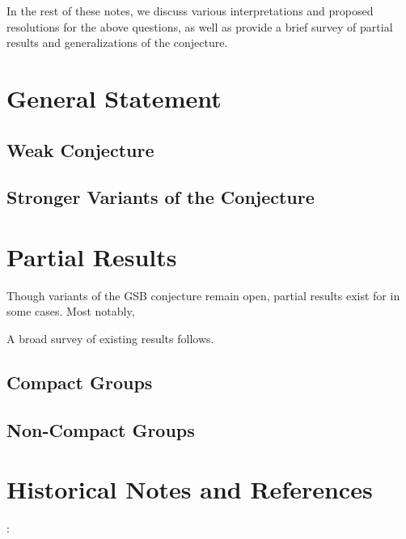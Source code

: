 In the rest of these notes, we discuss various interpretations and proposed resolutions for the above questions, as well as provide a brief survey of partial results and generalizations of the conjecture.










\section{General Statement}
\subsection{Weak Conjecture}
\subsection{Stronger Variants of the Conjecture}










\section{Partial Results}
Though variants of the GSB conjecture remain open, partial results exist for in some cases. Most notably, %

A broad survey of existing results follows.

\subsection{Compact Groups}

\subsection{Non-Compact Groups}










\section{Historical Notes and References}:

